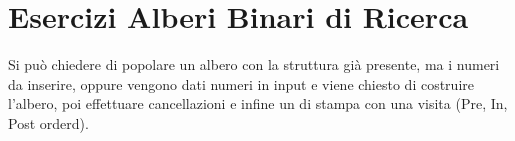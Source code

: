 \section{Esercizi Alberi Binari di Ricerca}
Si può chiedere di popolare un albero con la struttura già presente, ma i numeri da inserire, 
oppure vengono dati numeri in input e viene chiesto di costruire l'albero, poi effettuare
cancellazioni e infine un di stampa con una visita (Pre, In, Post orderd).